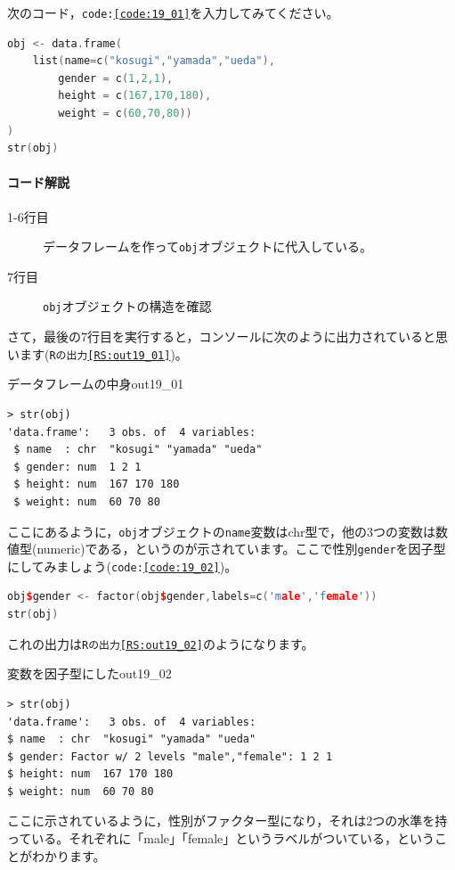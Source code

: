 \documentclass{ltjbook}
\begin{document}
次のコード，\texttt{code:\ref{code:19_01}}を入力してみてください。
\begin{lstlisting}[language=c++,label={code:19_01},caption={オブジェクトに代入}]
obj <- data.frame(
    list(name=c("kosugi","yamada","ueda"),
        gender = c(1,2,1),
        height = c(167,170,180),
        weight = c(60,70,80))
)
str(obj)
\end{lstlisting}
\paragraph{コード解説}
\begin{description}
	\item[1-6行目] データフレームを作って\texttt{obj}オブジェクトに代入している。
	\item[7行目] \texttt{obj}オブジェクトの構造を確認
\end{description}

さて，最後の7行目を実行すると，コンソールに次のように出力されていると思います(\texttt{Rの出力\ref{RS:out19_01}})。
\begin{Rscreen}{データフレームの中身}{out19_01}
	\begin{verbatim}
> str(obj)
'data.frame':	3 obs. of  4 variables:
 $ name  : chr  "kosugi" "yamada" "ueda"
 $ gender: num  1 2 1
 $ height: num  167 170 180
 $ weight: num  60 70 80
\end{verbatim}
\end{Rscreen}
ここにあるように，\texttt{obj}オブジェクトの\texttt{name}変数はchr型で，他の3つの変数は数値型(numeric)である，というのが示されています。ここで性別\texttt{gender}を因子型にしてみましょう(\texttt{code:\ref{code:19_02}})。

\begin{lstlisting}[language=c++,label={code:19_02},caption={因子型にする}]
obj$gender <- factor(obj$gender,labels=c('male','female'))
str(obj)
\end{lstlisting}

これの出力は\texttt{Rの出力\ref{RS:out19_02}}のようになります。
\begin{Rscreen}{変数を因子型にした}{out19_02}
	\begin{verbatim}
> str(obj)
'data.frame':	3 obs. of  4 variables:
$ name  : chr  "kosugi" "yamada" "ueda"
$ gender: Factor w/ 2 levels "male","female": 1 2 1
$ height: num  167 170 180
$ weight: num  60 70 80
\end{verbatim}
\end{Rscreen}
ここに示されているように，性別がファクター型になり，それは2つの水準を持っている。それぞれに「male」「female」というラベルがついている，ということがわかります。
\end{document}
